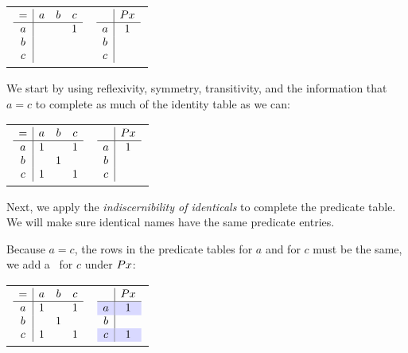 \documentclass[PHIL101-Textbook.tex]{subfiles}
\begin{document}
\begin{center}
  \begin{tabular}{ll}
	$\begin{array}{c|ccc}
		= & a & b & c\\ \hline
		a &&& 1\\
		b \\
		c
	\end{array}$
 &
	$\begin{array}{c|c}
		& \mathord{P}{x} \\ \hline
		a & 1\\
		b &\\
		c
	 \end{array}$
  \end{tabular}
\end{center}


We start by using reflexivity, symmetry, transitivity, and the information that $a=c$ to complete as much of the identity table as we can:

\begin{center}
  \begin{tabular}{ll}
	$\begin{array}{c|ccc}
	 = & a & b & c\\ \hline
	 a &1&& 1\\
	 b & &1\\
	 c &1&&1
	 \end{array}$
&
	$\begin{array}{c|c}
	   & \mathord{P}{x} \\ \hline
	 a & 1\\
	 b &\\
	 c
	 \end{array}$
  \end{tabular}
\end{center}

\noindent Next, we apply the \emph{indiscernibility of identicals} to complete the predicate table. We will make sure identical names have the same predicate entries.

\pagebreak

Because $a = c$, the rows in the predicate tables for $a$ and for $c$ must be the same, we add a \vT\ for $c$ under $\mathord{P}{x}$: 

\begin{center}
  \begin{tabular}{ll}
	$\begin{array}{c|ccc}
	 = & a & b & c\\ \hline
	 a &1&   &1\\
	 b &   &1\\
	 c &1&   &1
	\end{array}$
  & 
	$\begin{array}{c|c}
	  & \atom P x \\ \hline
	  \cellcolor{blue!15} a & \cellcolor{blue!15}\vT\\
						  b &\\
	  \cellcolor{blue!15} c & \cellcolor{blue!15}\vT
	\end{array}$
  \end{tabular}
\end{center}
\end{document}
